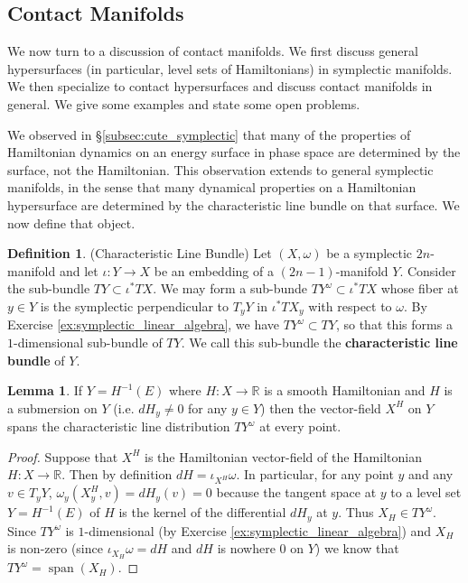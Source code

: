 \documentclass[12pt]{article}
\theoremstyle{definition}
\newtheorem{definition}[theorem]{Definition}
\numberwithin{equation}{section}
\newtheorem{lemma}[theorem]{Lemma}
\newcommand{\R}{{\mathbb R}}
\newcommand{\op}{\operatorname}
\begin{document}
\subsection{Contact Manifolds} We now turn to a discussion of contact manifolds. We first discuss general hypersurfaces (in particular, level sets of Hamiltonians) in symplectic manifolds. We then specialize to contact hypersurfaces and discuss contact manifolds in general. We give some examples and state some open problems.

We observed in \S \ref{subsec:cute_symplectic} that many of the properties of Hamiltonian dynamics on an energy surface in phase space are determined by the surface, not the Hamiltonian. This observation extends to general symplectic manifolds, in the sense that many dynamical properties on a Hamiltonian hypersurface are determined by the characteristic line bundle on that surface. We now define that object.

\begin{definition} (Characteristic Line Bundle) Let $(X,\omega)$ be a symplectic $2n$-manifold and let $\iota:Y \to X$ be an embedding of a $(2n-1)$-manifold $Y$. Consider the sub-bundle $TY \subset \iota^*TX$. We may form a sub-bunde $TY^\omega \subset \iota^*TX$ whose fiber at $y \in Y$ is the symplectic perpendicular to $T_yY$ in $\iota^*TX_y$ with respect to $\omega$. By Exercise \ref{ex:symplectic_linear_algebra}, we have $TY^\omega \subset TY$, so that this forms a $1$-dimensional sub-bundle of $TY$. We call this sub-bundle the {\bf characteristic line bundle} of $Y$.
\end{definition}

\begin{lemma} If $Y = H^{-1}(E)$ where $H:X \to \R$ is a smooth Hamiltonian and $H$ is a submersion on $Y$ (i.e. $dH_y \neq 0$ for any $y \in Y$) then the vector-field $X^H$ on $Y$ spans the characteristic line distribution $TY^\omega$ at every point. 
\end{lemma}

\begin{proof} Suppose that $X^H$ is the Hamiltonian vector-field of the Hamiltonian $H:X \to \R$. Then by definition $dH = \iota_{X^H}\omega$. In particular, for any point $y$ and any $v \in T_yY$, $\omega_y(X^H_y,v) = dH_y(v) = 0$ because the tangent space at $y$ to a level set $Y = H^{-1}(E)$ of $H$ is the kernel of the differential $dH_y$ at $y$. Thus $X_H \in TY^\omega$. Since $TY^\omega$ is $1$-dimensional (by Exercise \ref{ex:symplectic_linear_algebra}) and $X_H$ is non-zero (since $\iota_{X_H}\omega = dH$ and $dH$ is nowhere $0$ on $Y$) we know that $TY^\omega = \op{span}(X_H)$.
\end{proof}
\end{document}
